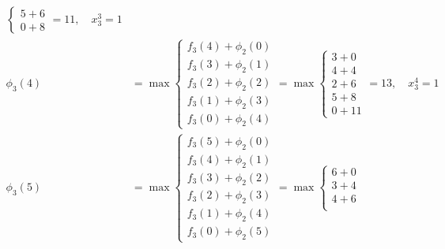 \documentclass{article}
\begin{document}
\[\begin{aligned}
\begin{cases}
                                                  5 + 6 \\
                                                  0 + 8
                                              \end{cases} = 11, \quad x_3^3 = 1               \\
        \phi_3(4) & = \max \begin{cases}
                               f_3(4) + \phi_2(0) \\
                               f_3(3) + \phi_2(1) \\
                               f_3(2) + \phi_2(2) \\
                               f_3(1) + \phi_2(3) \\
                               f_3(0) + \phi_2(4)
                           \end{cases} = \max \begin{cases}
                                                  3 + 0 \\
                                                  4 + 4 \\
                                                  2 + 6 \\
                                                  5 + 8 \\
                                                  0 + 11
                                              \end{cases} = 13, \quad x_3^4 = 1               \\
        \phi_3(5) & = \max \begin{cases}
                               f_3(5) + \phi_2(0) \\
                               f_3(4) + \phi_2(1) \\
                               f_3(3) + \phi_2(2) \\
                               f_3(2) + \phi_2(3) \\
                               f_3(1) + \phi_2(4) \\
                               f_3(0) + \phi_2(5)
                           \end{cases} = \max \begin{cases}
                                                  6 + 0  \\
                                                  3 + 4  \\
                                                  4 + 6  \\

\end{cases}
\end{aligned}\]
\end{document}
